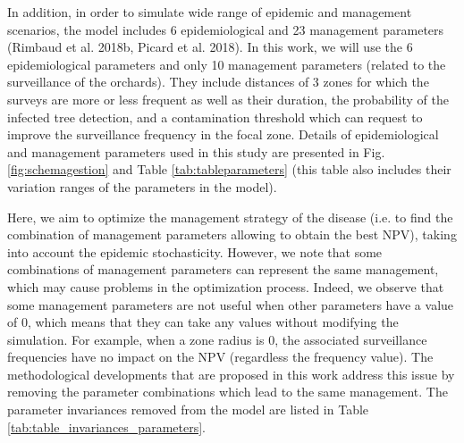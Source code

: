 In addition, in order to simulate wide range of epidemic and management scenarios, the model includes 6 epidemiological and 23 management parameters (Rimbaud et al. 2018b, Picard et al. 2018). In this work, we will use the 6 epidemiological parameters and only 10 management parameters (related to the surveillance of the orchards). They include distances of 3 zones for which the surveys are more or less frequent as well as their duration, the probability of the infected tree detection, and a contamination threshold which can request to improve the surveillance frequency in the focal zone. Details of epidemiological and management parameters used in this study are presented in Fig.\ref{fig:schemagestion} and Table \ref{tab:tableparameters} (this table also includes their variation ranges of the parameters in the model).

Here, we aim to optimize the management strategy of the disease (i.e. to find the combination of management parameters allowing to obtain the best NPV), taking into account the epidemic stochasticity. However, we note that some combinations of management parameters can represent the same management, which may cause problems in the optimization process. Indeed, we observe that some management parameters are not useful when other parameters have a value of 0, which means that they can take any values without modifying the simulation. For example, when a zone radius is 0, the associated surveillance frequencies have no impact on the NPV (regardless the frequency value). The methodological developments that are proposed in this work address this issue by removing the parameter combinations which lead to the same management. The parameter invariances removed from the model are listed in Table \ref{tab:table_invariances_parameters}.



